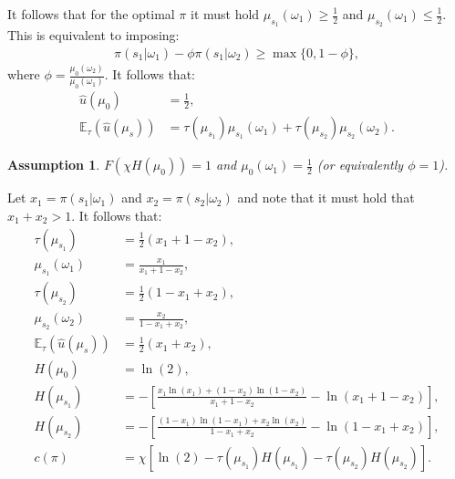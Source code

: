 \documentclass[12pt,a4paper]{article}
\newtheorem{assumption}{Assumption}
\begin{document}
It follows that for the optimal $\pi$ it must hold $\mu_{s_1}(\omega_1)\geq\frac{1}{2}$ and $\mu_{s_2}(\omega_1)\leq\frac{1}{2}$. This is equivalent to imposing:
\begin{align}
    \pi(s_1|\omega_1)-\phi\pi(s_1|\omega_2)\geq \max\{0,1-\phi\},
\end{align}
where $\phi=\frac{\mu_0(\omega_2)}{\mu_0(\omega_1)}$. It follows that:
\begin{align}
    \hat{u}(\mu_0) & = \frac{1}{2}, \\
    \mathbb{E}_\tau(\hat{u}(\mu_s)) & = \tau(\mu_{s_1})\mu_{s_1}(\omega_1) + \tau(\mu_{s_2})\mu_{s_2}(\omega_2).
\end{align}

\begin{assumption}
    $F(\chi H(\mu_0))=1$ and $\mu_0(\omega_1)=\frac{1}{2}$ (or equivalently $\phi=1$).
\end{assumption}

Let $x_1=\pi(s_1|\omega_1)$ and $x_2=\pi(s_2|\omega_2)$ and note that it must hold that $x_1+x_2>1$. It follows that:
\begin{align}
    \tau(\mu_{s_1}) & = \frac{1}{2}(x_1 + 1-x_2), \\
    \mu_{s_1}(\omega_1) & = \frac{x_1}{x_1 + 1-x_2}, \\
    \tau(\mu_{s_2}) & = \frac{1}{2}(1-x_1 + x_2), \\
    \mu_{s_2}(\omega_2) & = \frac{x_2}{1-x_1 + x_2}, \\
     \mathbb{E}_\tau(\hat{u}(\mu_s)) & = \frac{1}{2}(x_1+x_2), \\
     H(\mu_0) & = \ln(2), \\
     H(\mu_{s_1}) & = -\left[\frac{x_1\ln(x_1)+(1-x_2)\ln(1-x_2)}{x_1+1-x_2}-\ln(x_1+1-x_2)\right], \\
     H(\mu_{s_2}) & = -\left[\frac{(1-x_1)\ln(1-x_1)+x_2\ln(x_2)}{1-x_1+x_2}-\ln(1-x_1+x_2)\right], \\
     c(\pi) & = \chi\left[\ln(2)-\tau(\mu_{s_1})H(\mu_{s_1})-\tau(\mu_{s_2})H(\mu_{s_2})\right].
\end{align}
\end{document}
